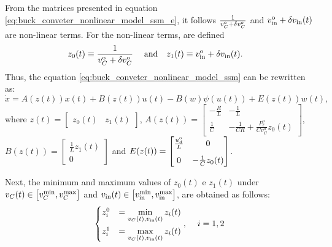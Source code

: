 From the matrices presented in equation \eqref{eq:buck_conveter_nonlinear_model_ssm_e}, it follows $\frac{1}{v_C^{\rm o} + \delta v_C^{\rm o}}$ and $v_{\rm{in}}^{\rm o} +\delta v_{\rm{in}}(t)$ are non-linear terms. For the non-linear terms, are defined
\begin{align}
  z_0(t) & \equiv \frac{1}{v_C^{\rm o} + \delta v_C^{\rm o}}  & \;\mathrm{and} &  &
  z_1(t) & \equiv v_{\rm{in}}^{\rm o} +\delta v_{\rm{in}}(t).
\end{align}
Thus, the equation \eqref{eq:buck_conveter_nonlinear_model_ssm} can be rewritten as:
\begin{equation}
  \dot x = A(z(t)) x(t) + B(z(t)) u(t) - B(w) \psi(u(t)) + E(z(t)) w(t),
\end{equation}
where $z(t) = \begin{bmatrix}z_0(t) & z_1(t)\end{bmatrix}$, $A(z(t))  = \begin{bmatrix}
    - \frac{R}{L} & - \frac{1}{L}                                       \\[8pt]
    \frac{1}{C}   & - \frac{1}{C R} + \frac{P_{\ell}^o}{C v_C^o} z_0(t)
  \end{bmatrix}$, $B(z(t))  = \begin{bmatrix}
    \frac{1}{L} z_1(t) \\[8pt] 0
  \end{bmatrix}$ and $E(z(t))  = \begin{bmatrix}
    \frac{u_d^{\rm o}}{L} & 0 \\[8pt] 0   & - \frac{1}{C} z_0(t)
  \end{bmatrix}$.

Next, the minimum and maximum values of $z_0(t)$ e $z_1(t)$ under $v_C(t) \in \left[v_C^{\rm{min}}, v_C^{\rm{max}}\right]$ and $v_{\rm{in}}(t) \in \left[v_{\rm{in}}^{\rm{min}}, v_{\rm{in}}^{\rm{max}}\right]$, are obtained as follows:
\begin{equation}
  \begin{cases}
    z_i^0 & = \min\limits_{v_C(t), v_{\rm{in}}(t)} z_i(t) \\[8pt]
    z_i^1 & = \max\limits_{v_C(t), v_{\rm{in}}(t)} z_i(t)
  \end{cases}, \hspace{12pt }i = 1, 2
\end{equation}

